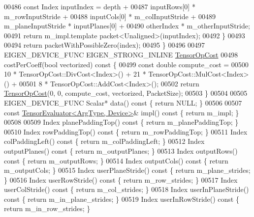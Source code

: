 \begin{DoxyCode}
00486       \textcolor{keyword}{const} Index inputIndex = depth +
00487           inputRows[0] * m\_rowInputStride +
00488           inputCols[0] * m\_colInputStride +
00489           m\_planeInputStride * inputPlanes[0] +
00490           otherIndex * m\_otherInputStride;
00491       \textcolor{keywordflow}{return} m\_impl.template packet<Unaligned>(inputIndex);
00492     \}
00493 
00494     \textcolor{keywordflow}{return} packetWithPossibleZero(index);
00495   \}
00496 
00497   EIGEN\_DEVICE\_FUNC EIGEN\_STRONG\_INLINE \hyperlink{class_eigen_1_1_tensor_op_cost}{TensorOpCost}
00498   costPerCoeff(\textcolor{keywordtype}{bool} vectorized)\textcolor{keyword}{ const }\{
00499     \textcolor{keyword}{const} \textcolor{keywordtype}{double} compute\_cost =
00500         10 * TensorOpCost::DivCost<Index>() + 21 * TensorOpCost::MulCost<Index>() +
00501         8 * TensorOpCost::AddCost<Index>();
00502     \textcolor{keywordflow}{return} \hyperlink{class_eigen_1_1_tensor_op_cost}{TensorOpCost}(0, 0, compute\_cost, vectorized, PacketSize);
00503   \}
00504 
00505   EIGEN\_DEVICE\_FUNC Scalar* data()\textcolor{keyword}{ const }\{ \textcolor{keywordflow}{return} NULL; \}
00506 
00507   \textcolor{keyword}{const} \hyperlink{struct_eigen_1_1_tensor_evaluator}{TensorEvaluator<ArgType, Device>}& impl()\textcolor{keyword}{ const }\{ \textcolor{keywordflow}{return} m\_impl; \}
00508 
00509   Index planePaddingTop()\textcolor{keyword}{ const }\{ \textcolor{keywordflow}{return} m\_planePaddingTop; \}
00510   Index rowPaddingTop()\textcolor{keyword}{ const }\{ \textcolor{keywordflow}{return} m\_rowPaddingTop; \}
00511   Index colPaddingLeft()\textcolor{keyword}{ const }\{ \textcolor{keywordflow}{return} m\_colPaddingLeft; \}
00512   Index outputPlanes()\textcolor{keyword}{ const }\{ \textcolor{keywordflow}{return} m\_outputPlanes; \}
00513   Index outputRows()\textcolor{keyword}{ const }\{ \textcolor{keywordflow}{return} m\_outputRows; \}
00514   Index outputCols()\textcolor{keyword}{ const }\{ \textcolor{keywordflow}{return} m\_outputCols; \}
00515   Index userPlaneStride()\textcolor{keyword}{ const }\{ \textcolor{keywordflow}{return} m\_plane\_strides; \}
00516   Index userRowStride()\textcolor{keyword}{ const }\{ \textcolor{keywordflow}{return} m\_row\_strides; \}
00517   Index userColStride()\textcolor{keyword}{ const }\{ \textcolor{keywordflow}{return} m\_col\_strides; \}
00518   Index userInPlaneStride()\textcolor{keyword}{ const }\{ \textcolor{keywordflow}{return} m\_in\_plane\_strides; \}
00519   Index userInRowStride()\textcolor{keyword}{ const }\{ \textcolor{keywordflow}{return} m\_in\_row\_strides; \}

\end{DoxyCode}
